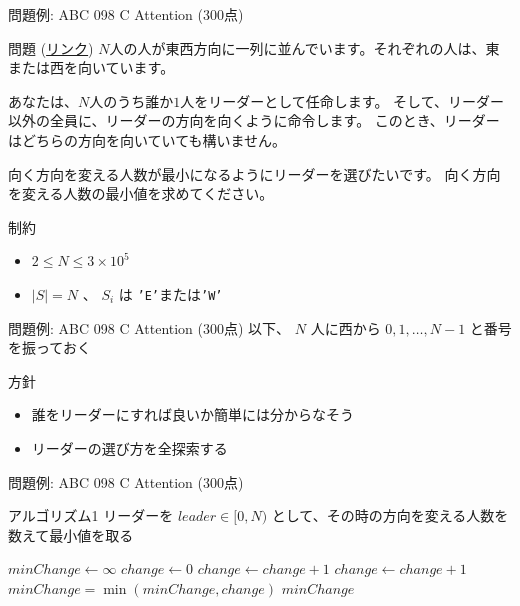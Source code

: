 \documentclass[dvipdfmx]{beamer}
\begin{document}
\begin{frame}{問題例: ABC 098 C Attention (300点)}
  \begin{block}{問題 (\href{https://beta.atcoder.jp/contests/abc098/tasks/arc098_a}{リンク})}
    $N$人の人が東西方向に一列に並んでいます。それぞれの人は、東または西を向いています。

    あなたは、$N$人のうち誰か$1$人をリーダーとして任命します。
    そして、リーダー以外の全員に、リーダーの方向を向くように命令します。
    このとき、リーダーはどちらの方向を向いていても構いません。

    向く方向を変える人数が最小になるようにリーダーを選びたいです。
    向く方向を変える人数の最小値を求めてください。
  \end{block}
  \begin{block}{制約}
    \begin{itemize}
      \item $2 \le N \le 3 \times 10^5$
      \item $|S| = N$ 、 $S_i$ は \texttt{'E'}または\texttt{'W'}
    \end{itemize}
  \end{block}
\end{frame}

\begin{frame}{問題例: ABC 098 C Attention (300点)}
  以下、 $N$ 人に西から $0, 1, \ldots, N-1$ と番号を振っておく
  \begin{block}{方針}
    \begin{itemize}
      \item 誰をリーダーにすれば良いか簡単には分からなそう
      \item リーダーの選び方を全探索する
    \end{itemize}
  \end{block}
\end{frame}

\begin{frame}{問題例: ABC 098 C Attention (300点)}
  \begin{block}{アルゴリズム1}
    リーダーを $leader \in [0, N)$ として、その時の方向を変える人数を数えて最小値を取る
    \begin{algorithmic}
      \STATE $minChange \leftarrow \infty$
      \STATE $change \leftarrow 0$
      \STATE $change \leftarrow change + 1$
      \ENDIF
      \ENDFOR
      \STATE $change \leftarrow change + 1$
      \ENDIF
      \ENDFOR
      \STATE $minChange = \min(minChange, change)$
      \ENDFOR
      \RETURN $minChange$
    \end{algorithmic}
  \end{block}
\end{frame}
\end{document}
